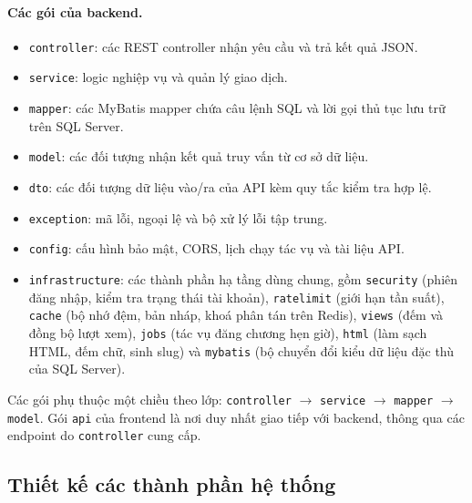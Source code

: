 \paragraph{Các gói của backend.}
\begin{itemize}
    \item \texttt{controller}: các REST controller nhận yêu cầu và trả kết quả JSON.
    \item \texttt{service}: logic nghiệp vụ và quản lý giao dịch.
    \item \texttt{mapper}: các MyBatis mapper chứa câu lệnh SQL và lời gọi thủ tục lưu trữ trên SQL Server.
    \item \texttt{model}: các đối tượng nhận kết quả truy vấn từ cơ sở dữ liệu.
    \item \texttt{dto}: các đối tượng dữ liệu vào/ra của API kèm quy tắc kiểm tra hợp lệ.
    \item \texttt{exception}: mã lỗi, ngoại lệ và bộ xử lý lỗi tập trung.
    \item \texttt{config}: cấu hình bảo mật, CORS, lịch chạy tác vụ và tài liệu API.
    \item \texttt{infrastructure}: các thành phần hạ tầng dùng chung, gồm \texttt{security} (phiên đăng nhập, kiểm tra trạng thái tài khoản), \texttt{ratelimit} (giới hạn tần suất), \texttt{cache} (bộ nhớ đệm, bản nháp, khoá phân tán trên Redis), \texttt{views} (đếm và đồng bộ lượt xem), \texttt{jobs} (tác vụ đăng chương hẹn giờ), \texttt{html} (làm sạch HTML, đếm chữ, sinh slug) và \texttt{mybatis} (bộ chuyển đổi kiểu dữ liệu đặc thù của SQL Server).
\end{itemize}

Các gói phụ thuộc một chiều theo lớp: \texttt{controller} $\rightarrow$ \texttt{service} $\rightarrow$ \texttt{mapper} $\rightarrow$ \texttt{model}. Gói \texttt{api} của frontend là nơi duy nhất giao tiếp với backend, thông qua các endpoint do \texttt{controller} cung cấp.

\subsection{Thiết kế các thành phần hệ thống}
\label{subsec:system-components}

